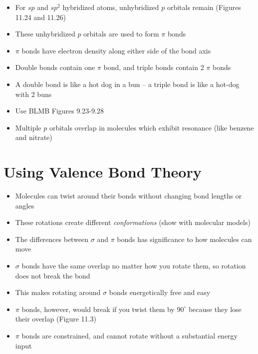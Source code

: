 \documentclass[12pt, openany, letterpaper]{memoir}
\begin{document}
\begin{itemize}
\begin{itemize}
		\item For $sp$ and $sp^2$ hybridized atoms, unhybridized $p$ orbitals remain (Figures 11.24 and 11.26)
		\item These unhybridized $p$ orbitals are used to form $\pi$ bonds
		\item $\pi$ bonds have electron density along either side of the bond axis
		\item Double bonds contain one $\pi$ bond, and triple bonds contain 2 $\pi$ bonds
		\item A double bond is like a hot dog in a bun -- a triple bond is like a hot-dog with 2 buns
		\item Use BLMB Figures 9.23-9.28
		\item Multiple $p$ orbitals overlap in molecules which exhibit resonance (like benzene and nitrate)
	\end{itemize}
\end{itemize}
\section{Using Valence Bond Theory}
\begin{itemize}
	\item Molecules can twist around their bonds without changing bond lengths or angles
	\item These rotations create different \emph{conformations} (show with molecular models)
	\item The differences between $\sigma$ and $\pi$ bonds has significance to how molecules can move
	\item $\sigma$ bonds have the same overlap no matter how you rotate them, so rotation does not break the bond
	\item This makes rotating around $\sigma$ bonds energetically free and easy
	\item $\pi$ bonds, however, would break if you twist them by $90^\circ$ because they lose their overlap (Figure 11.3)
	\item $\pi$ bonds are constrained, and cannot rotate without a substantial energy input	
\end{itemize}
\end{document}
